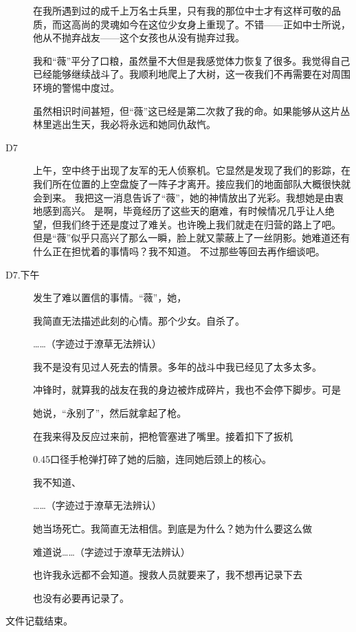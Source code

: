 \begin{description}
在我所遇到过的成千上万名士兵里，只有我的那位中士才有这样可敬的品质，而这高尚的灵魂如今在这位少女身上重现了。不错——正如中士所说，他从不抛弃战友——这个女孩也从没有抛弃过我。

我和“薇”平分了口粮，虽然量不大但是我感觉体力恢复了很多。我觉得自己已经能够继续战斗了。我顺利地爬上了大树，这一夜我们不再需要在对周围环境的警惕中度过。

虽然相识时间甚短，但“薇”这已经是第二次救了我的命。如果能够从这片丛林里逃出生天，我必将永远和她同仇敌忾。

\item[D7]
上午，空中终于出现了友军的无人侦察机。它显然是发现了我们的影踪，在我们所在位置的上空盘旋了一阵子才离开。接应我们的地面部队大概很快就会到来。
我把这一消息告诉了“薇”，她的神情放出了光彩。我想她是由衷地感到高兴。
是啊，毕竟经历了这些天的磨难，有时候情况几乎让人绝望，但我们终于还是度过了难关。也许晚上我们就走在归营的路上了吧。
但是“薇”似乎只高兴了那么一瞬，脸上就又蒙蔽上了一丝阴影。她难道还有什么正在担忧着的事情吗？我不知道。
不过那些等回去再作细谈吧。

\item[D7.下午]
发生了难以置信的事情。“薇”，她，

我简直无法描述此刻的心情。那个少女。自杀了。

……（字迹过于潦草无法辨认）

我不是没有见过人死去的情景。多年的战斗中我已经见了太多太多。

冲锋时，就算我的战友在我的身边被炸成碎片，我也不会停下脚步。可是

她说，“永别了”，然后就拿起了枪。

在我来得及反应过来前，把枪管塞进了嘴里。接着扣下了扳机

0.45口径手枪弹打碎了她的后脑，连同她后颈上的核心。

我不知道、

……（字迹过于潦草无法辨认）

她当场死亡。我简直无法相信。到底是为什么？她为什么要这么做

难道说……（字迹过于潦草无法辨认）

也许我永远都不会知道。搜救人员就要来了，我不想再记录下去

也没有必要再记录了。
\end{description}

\lineseparator

文件记载结束。

\setcounter{secnumdepth}{0}
